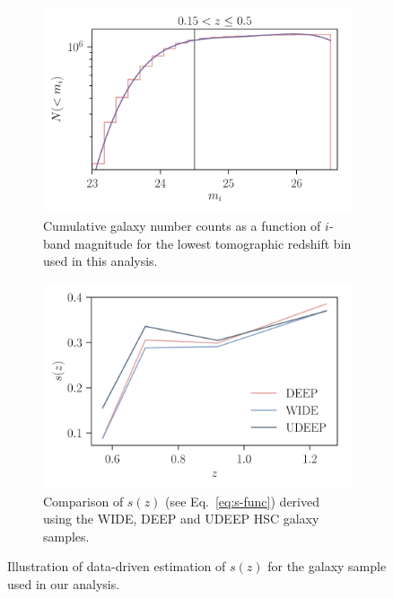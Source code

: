 \documentclass[a4paper,11pt]{article}
\begin{document}
    \begin{figure}
      \begin{center}
        \begin{subfigure}[t]{0.47\textwidth}
        \centering
        \includegraphics[width=\textwidth]{figures/mag-dist-cumulative=True+fit-mmin=23-sample=WIDE-bin=0.pdf}
        \caption{Cumulative galaxy number counts as a function of $i$-band magnitude for the lowest tomographic redshift bin used in this analysis.}
        \end{subfigure}\hfill
        \begin{subfigure}[t]{0.47\textwidth}
        \centering
        \includegraphics[width=\textwidth]{figures/s-z-func-samples=WIDE-DEEP-UDEEP.pdf}
        \caption{Comparison of $s(z)$ (see Eq.~\ref{eq:s-func}) derived using the WIDE, DEEP and UDEEP HSC galaxy samples.}
        \end{subfigure}
        \caption{Illustration of data-driven estimation of $s(z)$ for the galaxy sample used in our analysis.} 
        \label{fig:s-func-estimation}
      \end{center}
    \end{figure}
\end{document}
